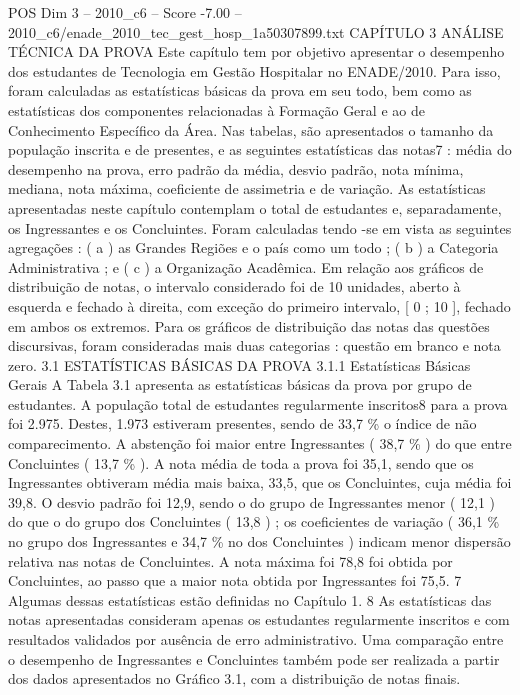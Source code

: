 \begin{textsample}{POS Dim 3 – 2010\_c6 – Score -7.00 – 2010\_c6/enade\_2010\_tec\_gest\_hosp\_1a50307899.txt}  \label{ex:f3_pos_270}
CAPÍTULO 3 ANÁLISE TÉCNICA DA PROVA Este capítulo tem por objetivo apresentar o desempenho dos estudantes de Tecnologia em Gestão Hospitalar no ENADE/2010.
Para isso, foram calculadas as estatísticas básicas da prova em seu todo, bem como as estatísticas dos componentes relacionadas à Formação Geral e ao de Conhecimento Específico da Área.
Nas tabelas, são apresentados o tamanho da população inscrita e de presentes, e as seguintes estatísticas das notas7 : média do desempenho na prova, erro padrão da média, desvio padrão, nota mínima, mediana, nota máxima, coeficiente de assimetria e de variação.
As estatísticas apresentadas neste capítulo contemplam o total de estudantes e, separadamente, os Ingressantes e os Concluintes.
Foram calculadas tendo -se em vista as seguintes agregações : ( a ) as Grandes Regiões e o país como um todo ; ( b ) a Categoria Administrativa ; e ( c ) a Organização Acadêmica.
Em relação aos gráficos de distribuição de notas, o intervalo considerado foi de 10 unidades, aberto à esquerda e fechado à direita, com exceção do primeiro intervalo, [ 0 ; 10 ], fechado em ambos os extremos.
Para os gráficos de distribuição das notas das questões discursivas, foram consideradas mais duas categorias : questão em branco e nota zero. 3.1 ESTATÍSTICAS BÁSICAS DA PROVA 3.1.1 Estatísticas Básicas Gerais A Tabela 3.1 apresenta as estatísticas básicas da prova por grupo de estudantes.
A população total de estudantes regularmente inscritos8 para a prova foi 2.975.
Destes, 1.973 estiveram presentes, sendo de 33,7 \% o índice de não comparecimento.
A abstenção foi maior entre Ingressantes ( 38,7 \% ) do que entre Concluintes ( 13,7 \% ).
A nota média de toda a prova foi 35,1, sendo que os Ingressantes obtiveram média mais baixa, 33,5, que os Concluintes, cuja média foi 39,8.
O desvio padrão foi 12,9, sendo o do grupo de Ingressantes menor ( 12,1 ) do que o do grupo dos Concluintes ( 13,8 ) ; os coeficientes de variação ( 36,1 \% no grupo dos Ingressantes e 34,7 \% no dos Concluintes ) indicam menor dispersão relativa nas notas de Concluintes.
A nota máxima foi 78,8 foi obtida por Concluintes, ao passo que a maior nota obtida por Ingressantes foi 75,5. 7 Algumas dessas estatísticas estão definidas no Capítulo 1. 8 As estatísticas das notas apresentadas consideram apenas os estudantes regularmente inscritos e com resultados validados por ausência de erro administrativo.
Uma comparação entre o desempenho de Ingressantes e Concluintes também pode ser realizada a partir dos dados apresentados no Gráfico 3.1, com a distribuição de notas finais.

\end{textsample}
